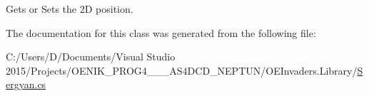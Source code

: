 Gets or Sets the 2D position. 



The documentation for this class was generated from the following file\+:\begin{DoxyCompactItemize}
\item 
C\+:/\+Users/\+D/\+Documents/\+Visual Studio 2015/\+Projects/\+O\+E\+N\+I\+K\+\_\+\+P\+R\+O\+G4\+\_\+\_\+\_\+\+A\+S4\+D\+C\+D\+\_\+\+N\+E\+P\+T\+U\+N/\+O\+E\+Invaders.\+Library/\mbox{\hyperlink{_sergyan_8cs}{Sergyan.\+cs}}\end{DoxyCompactItemize}
